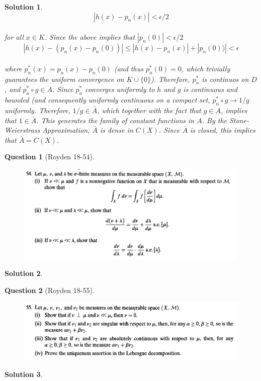 \documentclass{article} %
\theoremstyle{quest}
\newtheorem*{question}{Question}
\newtheorem*{solution}{Solution}
\begin{document}
\begin{solution}
$$|h(x)-p_{n}(x)|<\epsilon /2 $$\\

for all $x \in K$. Since the above implies that $|p_n(0)|< \epsilon/2$  \\
 
$$|h(x)-(p_{n}(x)-p_n(0))|\leq |h(x)-p_{n}(x)|+|p_n(0))|<\epsilon $$\\

where $p^*_n(x)=p_{n}(x)-p_n(0)$ (and thus $p^*_n(0)=0$, which trivially guarantees the uniform convergence on $K\cup\{0\}$). Therefore, $p^*_n$ is continuos on $D$, and $p^*_n \circ g \in A$. Since $p^*_n$ converges uniformly to $h$ and $g$ is continuous and bounded (and consequently uniformly continuous on a compact set, $p^*_n\circ g \rightarrow 1/g$ uniformly. Therefore, $1/g \in \bar {A}$, which together with the fact that $g \in A$, implies that $1 \in \bar {A}$. This generates the family of constant functions in $A$.  By the Stone-Weierstrass Approximation, $\bar {A}$ is dense in $C(X)$. Since $\bar{A}$ is closed, this implies that $\bar {A}=C(X)$. \\
\end{solution}
\begin{question}[Royden 18-54]
\hfill
\begin{figure}[h!]
  \centering
    \includegraphics[width=1\textwidth]{rv-18-54.png}
\end{figure}
\end{question}
\begin{solution}
\end{solution}
\newpage

\begin{question}[Royden 18-55]
\hfill
\begin{figure}[h!]
  \centering
    \includegraphics[width=1\textwidth]{rv-18-55.png}
\end{figure}
\end{question}
\begin{solution}
\end{solution}
\end{document}
